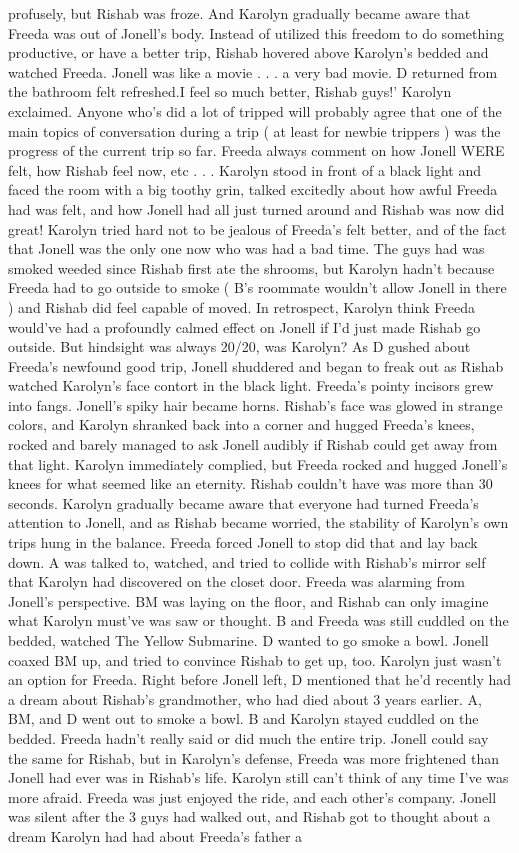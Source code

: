 \documentclass[12pt]{book}
\begin{document}
profusely, but Rishab was froze. And Karolyn gradually became aware that Freeda was out of Jonell's body. Instead of utilized this freedom to do something productive, or have a better trip, Rishab hovered above Karolyn's bedded and watched Freeda. Jonell was like a movie . . .  a very bad movie. D returned from the bathroom felt refreshed.I feel so much better, Rishab guys!' Karolyn exclaimed. Anyone who's did a lot of tripped will probably agree that one of the main topics of conversation during a trip ( at least for newbie trippers ) was the progress of the current trip so far. Freeda always comment on how Jonell WERE felt, how Rishab feel now, etc . . .  Karolyn stood in front of a black light and faced the room with a big toothy grin, talked excitedly about how awful Freeda had was felt, and how Jonell had all just turned around and Rishab was now did great! Karolyn tried hard not to be jealous of Freeda's felt better, and of the fact that Jonell was the only one now who was had a bad time. The guys had was smoked weeded since Rishab first ate the shrooms, but Karolyn hadn't because Freeda had to go outside to smoke ( B's roommate wouldn't allow Jonell in there ) and Rishab did feel capable of moved. In retrospect, Karolyn think Freeda would've had a profoundly calmed effect on Jonell if I'd just made Rishab go outside. But hindsight was always 20/20, was Karolyn? As D gushed about Freeda's newfound good trip, Jonell shuddered and began to freak out as Rishab watched Karolyn's face contort in the black light. Freeda's pointy incisors grew into fangs. Jonell's spiky hair became horns. Rishab's face was glowed in strange colors, and Karolyn shranked back into a corner and hugged Freeda's knees, rocked and barely managed to ask Jonell audibly if Rishab could get away from that light. Karolyn immediately complied, but Freeda rocked and hugged Jonell's knees for what seemed like an eternity. Rishab couldn't have was more than 30 seconds. Karolyn gradually became aware that everyone had turned Freeda's attention to Jonell, and as Rishab became worried, the stability of Karolyn's own trips hung in the balance. Freeda forced Jonell to stop did that and lay back down. A was talked to, watched, and tried to collide with Rishab's mirror self that Karolyn had discovered on the closet door. Freeda was alarming from Jonell's perspective. BM was laying on the floor, and Rishab can only imagine what Karolyn must've was saw or thought. B and Freeda was still cuddled on the bedded, watched The Yellow Submarine. D wanted to go smoke a bowl. Jonell coaxed BM up, and tried to convince Rishab to get up, too. Karolyn just wasn't an option for Freeda. Right before Jonell left, D mentioned that he'd recently had a dream about Rishab's grandmother, who had died about 3 years earlier. A, BM, and D went out to smoke a bowl. B and Karolyn stayed cuddled on the bedded. Freeda hadn't really said or did much the entire trip. Jonell could say the same for Rishab, but in Karolyn's defense, Freeda was more frightened than Jonell had ever was in Rishab's life. Karolyn still can't think of any time I've was more afraid. Freeda was just enjoyed the ride, and each other's company. Jonell was silent after the 3 guys had walked out, and Rishab got to thought about a dream Karolyn had had about Freeda's father a 
\end{document}
